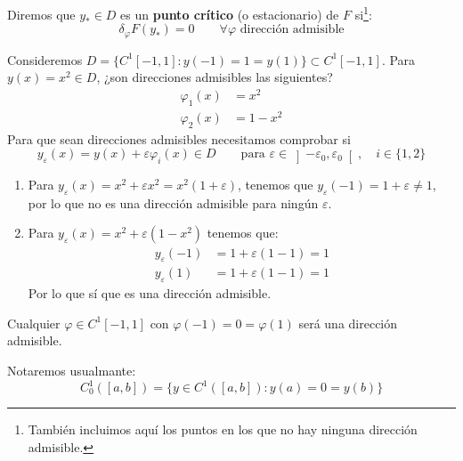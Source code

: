 \noindent
Diremos que $y_\ast\in D$ es un \textbf{punto crítico} (o estacionario) de $F$ si\footnote{También incluimos aquí los puntos en los que no hay ninguna dirección admisible.}:
\begin{equation*}
    \delta_\varphi F(y_\ast) = 0 \qquad \forall \varphi \text{\ dirección admisible}
\end{equation*}

\begin{ejemplo}
    Consideremos $D = \{C^1[-1,1] : y(-1) = 1 = y(1)\}\subset C^1[-1,1]$. Para $y(x) = x^2 \in D$, ¿son direcciones admisibles las siguientes?
    \begin{align*}
        \varphi_1(x) &= x^2 \\
        \varphi_2(x) &= 1-x^2
    \end{align*}
    Para que sean direcciones admisibles necesitamos comprobar si
    \begin{equation*}
        y_{\varepsilon}(x) = y(x) + \varepsilon\varphi_i(x)\in D \qquad \text{para $\varepsilon \in \left]-\varepsilon_0,\varepsilon_0\right[$}, \quad i \in \{1,2\}
    \end{equation*}
    \begin{enumerate}
        \item Para $y_\varepsilon(x) = x^2+\varepsilon x^2 = x^2(1+\varepsilon)$, tenemos que $y_{\varepsilon}(-1) = 1+\varepsilon\neq 1$, por lo que no es una dirección admisible para ningún $\varepsilon$.
        \item Para $y_{\varepsilon}(x) = x^2+\varepsilon (1-x^2)$ tenemos que:
            \begin{align*}
                y_{\varepsilon}(-1) &= 1 + \varepsilon(1-1) = 1 \\
                y_\varepsilon(1) &= 1 + \varepsilon(1-1) = 1
            \end{align*}
            Por lo que sí que es una dirección admisible.
    \end{enumerate}
    Cualquier $\varphi \in C^1[-1,1]$ con $\varphi(-1) = 0 = \varphi(1)$ será una dirección admisible.
\end{ejemplo}

\begin{notacion}
    Notaremos usualmante:
    \begin{equation*}
        C^1_0([a,b]) = \{y\in C^1([a,b]) : y(a) = 0 = y(b)\}
    \end{equation*}
\end{notacion}

